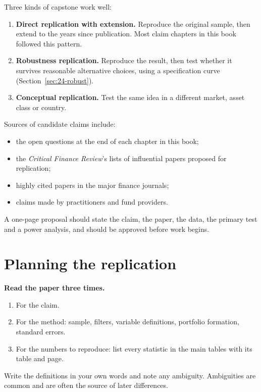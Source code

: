 Three kinds of capstone work well:

\begin{enumerate}
  \item \textbf{Direct replication with extension.} Reproduce the original sample, then extend to the years since publication. Most claim chapters in this book followed this pattern.
  \item \textbf{Robustness replication.} Reproduce the result, then test whether it survives reasonable alternative choices, using a specification curve (Section~\ref{sec:24-robust}).
  \item \textbf{Conceptual replication.} Test the same idea in a different market, asset class or country.
\end{enumerate}

Sources of candidate claims include:

\begin{itemize}
  \item the open questions at the end of each chapter in this book;
  \item the \emph{Critical Finance Review}'s lists of influential papers proposed for replication;
  \item highly cited papers in the major finance journals;
  \item claims made by practitioners and fund providers.
\end{itemize}

A one-page proposal should state the claim, the paper, the data, the primary test and a power analysis, and should be approved before work begins.

\section{Planning the replication}
\label{sec:24-planning}

\textbf{Read the paper three times.}

\begin{enumerate}
  \item For the claim.
  \item For the method: sample, filters, variable definitions, portfolio formation, standard errors.
  \item For the numbers to reproduce: list every statistic in the main tables with its table and page.
\end{enumerate}

Write the definitions in your own words and note any ambiguity. Ambiguities are common and are often the source of later differences.


